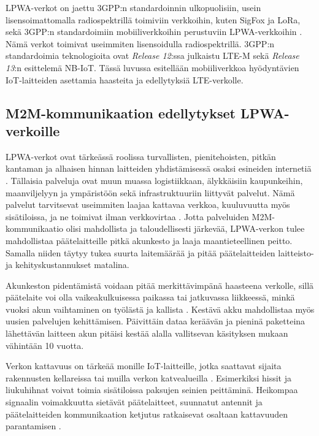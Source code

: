 \documentclass[finnish, 12pt, a4paper, elec, latin1, utf8, online]{aaltothesis}
\begin{document}
LPWA-verkot on jaettu 3GPP:n standardoinnin ulkopuolisiin, usein lisensoimattomalla radiospektrillä toimiviin verkkoihin, kuten SigFox ja LoRa, sekä 3GPP:n standardoimiin mobiiliverkkoihin perustuviin LPWA-verkkoihin \cite{nokiawhitepaper}. Nämä verkot toimivat useimmiten lisensoidulla radiospektrillä. 3GPP:n standardoimia teknologioita ovat \textit{Release 12}:ssa julkaistu LTE-M sekä \textit{Release 13}:n esittelemä NB-IoT. Tässä luvussa esitellään mobiiliverkkoa hyödyntävien IoT-laitteiden asettamia haasteita ja edellytyksiä LTE-verkolle.

\subsection{M2M-kommunikaation edellytykset LPWA-verkoille}

LPWA-verkot ovat tärkeässä roolissa turvallisten, pienitehoisten, pitkän kantaman ja alhaisen hinnan laitteiden yhdistämisessä osaksi esineiden internetiä \cite{gsmawhitepaper}. Tällaisia palveluja ovat muun muassa logistiikkaan, älykkäisiin kaupunkeihin, maanviljelyyn ja ympäristöön sekä infrastruktuuriin liittyvät palvelut. Nämä palvelut tarvitsevat useimmiten laajaa kattavaa verkkoa, kuuluvuutta myös sisätiloissa, ja ne toimivat ilman verkkovirtaa \cite{gsmawhitepaper}. Jotta palveluiden M2M-kommunikaatio olisi mahdollista ja taloudellisesti järkevää, LPWA-verkon tulee mahdollistaa päätelaitteille pitkä akunkesto ja laaja maantieteellinen peitto. Samalla niiden täytyy tukea suurta laitemäärää ja pitää päätelaitteiden laitteisto- ja kehityskustannukset matalina.

Akunkeston pidentämistä voidaan pitää merkittävimpänä haasteena verkolle, sillä päätelaite voi olla vaikeakulkuisessa paikassa tai jatkuvassa liikkeessä, minkä vuoksi akun vaihtaminen on työlästä ja kallista \cite{nokiawhitepaper}. Kestävä akku mahdollistaa myös uusien palvelujen kehittämisen. Päivittäin dataa keräävän ja pieninä paketteina lähettävän laitteen akun pitäisi kestää alalla vallitsevan käsityksen mukaan vähintään 10 vuotta.

Verkon kattavuus on tärkeää monille IoT-laitteille, jotka saattavat sijaita rakennusten kellareissa tai muilla verkon katvealueilla \cite{nokiawhitepaper}. Esimerkiksi hissit ja liukuhihnat voivat toimia sisätiloissa paksujen seinien peittäminä. Heikompaa signaalin voimakkuutta sietävät päätelaitteet, suunnatut antennit ja päätelaitteiden kommunikaation ketjutus ratkaisevat osaltaan kattavuuden parantamisen \cite{diaz20163gpp}.
\end{document}
